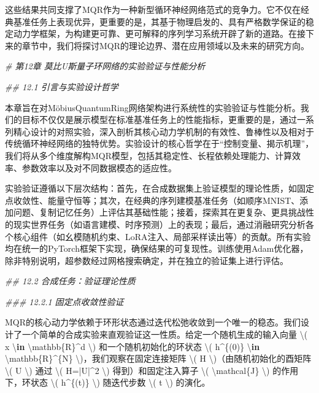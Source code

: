 \documentclass[
  12pt,
]{article}
\newenvironment{Shaded}{}{}
\newcommand{\CommentTok}[1]{\textcolor[rgb]{0.38,0.63,0.69}{\textit{#1}}}
\newcommand{\DecValTok}[1]{\textcolor[rgb]{0.25,0.63,0.44}{#1}}
\newcommand{\KeywordTok}[1]{\textcolor[rgb]{0.00,0.44,0.13}{\textbf{#1}}}
\newcommand{\NormalTok}[1]{#1}
\newcommand{\OperatorTok}[1]{\textcolor[rgb]{0.40,0.40,0.40}{#1}}
\begin{document}
\begin{Shaded}
\begin{Highlighting}[]
\NormalTok{这些结果共同支撑了MQR作为一种新型循环神经网络范式的竞争力。它不仅在经典基准任务上表现优异，更重要的是，其基于物理启发的、具有严格数学保证的稳定动力学框架，为构建更可靠、更可解释的序列学习系统开辟了新的道路。在接下来的章节中，我们将探讨MQR的理论边界、潜在应用领域以及未来的研究方向。}

\CommentTok{\# 第12章 莫比U斯量子环网络的实验验证与性能分析}

\CommentTok{\#\# 12.1 引言与实验设计哲学}

\NormalTok{本章旨在对MöbiusQuantumRing网络架构进行系统性的实验验证与性能分析。我们的目标不仅仅是展示模型在标准基准任务上的性能指标，更重要的是，通过一系列精心设计的对照实验，深入剖析其核心动力学机制的有效性、鲁棒性以及相对于传统循环神经网络的独特优势。实验设计的核心哲学在于“控制变量、揭示机理”，我们将从多个维度解构MQR模型，包括其稳定性、长程依赖处理能力、计算效率、参数效率以及对不同数据模态的适应性。}

\NormalTok{实验验证遵循以下层次结构：首先，在合成数据集上验证模型的理论性质，如固定点收敛性、能量守恒等；其次，在经典的序列建模基准任务（如顺序MNIST、添加问题、复制记忆任务）上评估其基础性能；接着，探索其在更复杂、更具挑战性的现实世界任务（如语言建模、时序预测）上的表现；最后，通过消融研究分析各个核心组件（如幺模随机约束、LoRA注入、局部采样读出等）的贡献。所有实验均在统一的PyTorch框架下实现，确保结果的可复现性。训练使用Adam优化器，除非特别说明，超参数经过网格搜索确定，并在独立的验证集上进行评估。}

\CommentTok{\#\# 12.2 合成任务：验证理论性质}

\CommentTok{\#\#\# 12.2.1 固定点收敛性验证}

\NormalTok{MQR的核心动力学依赖于环形状态通过迭代松弛收敛到一个唯一的稳态。我们设计了一个简单的合成实验来直观验证这一性质。给定一个随机生成的输入向量 }\OperatorTok{\textbackslash{}}\NormalTok{( x }\OperatorTok{\textbackslash{}}\KeywordTok{in} \OperatorTok{\textbackslash{}}\NormalTok{mathbb\{R\}}\OperatorTok{\^{}}\NormalTok{d }\OperatorTok{\textbackslash{}}\NormalTok{) 和一个随机初始化的环状态 }\OperatorTok{\textbackslash{}}\NormalTok{( h}\OperatorTok{\^{}}\NormalTok{\{(}\DecValTok{0}\NormalTok{)\} }\OperatorTok{\textbackslash{}}\KeywordTok{in} \OperatorTok{\textbackslash{}}\NormalTok{mathbb\{R\}}\OperatorTok{\^{}}\NormalTok{\{N\} }\OperatorTok{\textbackslash{}}\NormalTok{)，我们观察在固定连接矩阵 }\OperatorTok{\textbackslash{}}\NormalTok{( H }\OperatorTok{\textbackslash{}}\NormalTok{)（由随机初始化的酉矩阵 }\OperatorTok{\textbackslash{}}\NormalTok{( U }\OperatorTok{\textbackslash{}}\NormalTok{) 通过 }\OperatorTok{\textbackslash{}}\NormalTok{( H}\OperatorTok{=|}\NormalTok{U}\OperatorTok{|\^{}}\DecValTok{2} \OperatorTok{\textbackslash{}}\NormalTok{) 得到）和固定注入算子 }\OperatorTok{\textbackslash{}}\NormalTok{( }\OperatorTok{\textbackslash{}}\NormalTok{mathcal\{J\} }\OperatorTok{\textbackslash{}}\NormalTok{) 的作用下，环状态 }\OperatorTok{\textbackslash{}}\NormalTok{( h}\OperatorTok{\^{}}\NormalTok{\{(t)\} }\OperatorTok{\textbackslash{}}\NormalTok{) 随迭代步数 }\OperatorTok{\textbackslash{}}\NormalTok{( t }\OperatorTok{\textbackslash{}}\NormalTok{) 的演化。}


\end{Highlighting}
\end{Shaded}
\end{document}
